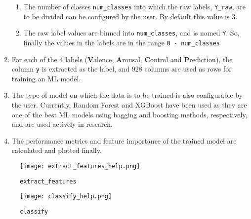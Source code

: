 \begin{enumerate}
\begin{enumerate}
        \item The number of classes \texttt{num\_classes} into which the raw labels, \texttt{Y\_raw}, are to be divided can be configured by the user. By default this value is 3.
        \item The raw label values are binned into \texttt{num\_classes}, and is named \texttt{Y}. So, finally the values in the labels are in the range \texttt{0 - num\_classes}
    \end{enumerate}
    \item For each of the 4 labels (\textbf{V}alence, \textbf{A}rousal, \textbf{C}ontrol and \textbf{P}rediction), the column \texttt{y} is extracted as the label, and 928 columns are used as rows for training an ML model.
    \item The type of model on which the data is to be trained is also configurable by the user. Currently, Random Forest and XGBoost have been used as they are one of the best ML models using bagging and boosting methods, respectively, and are used actively in research.
    \item The performance metrics and feature importance of the trained model are calculated and plotted finally.
\end{enumerate}

\begin{figure}[H]
\centering
\texttt{[image: extract\_features\_help.png]}
\caption{\texttt{extract\_features}}
\label{fig-5-7}
\end{figure}

\begin{figure}[H]
\centering
\texttt{[image: classify\_help.png]}
\caption{\texttt{classify}}
\label{fig-5-8}
\end{figure}
